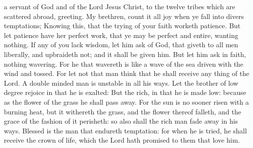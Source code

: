  a servant of God and of the Lord Jesus Christ, to the twelve tribes which are scattered abroad, greeting. My brethren, count it all joy when ye fall into divers temptations; Knowing this, that the trying of your faith worketh patience. But let patience have her perfect work, that ye may be perfect and entire, wanting nothing. If any of you lack wisdom, let him ask of God, that giveth to all men liberally, and upbraideth not; and it shall be given him. But let him ask in faith, nothing wavering. For he that wavereth is like a wave of the sea driven with the wind and tossed. For let not that man think that he shall receive any thing of the Lord. A double minded man is unstable in all his ways. Let the brother of low degree rejoice in that he is exalted: But the rich, in that he is made low: because as the flower of the grass he shall pass away. For the sun is no sooner risen with a burning heat, but it withereth the grass, and the flower thereof falleth, and the grace of the fashion of it perisheth: so also shall the rich man fade away in his ways. Blessed is the man that endureth temptation: for when he is tried, he shall receive the crown of life, which the Lord hath promised to them that love him.



